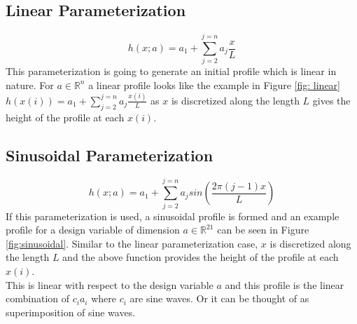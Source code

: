 \documentclass{article}
\begin{document}
\subsection{Linear Parameterization}
\begin{equation}
h(x;a) = a_1 + \sum_{j=2}^{j=n} a_j \frac{x}{L} 
\end{equation}
This parameterization is going to generate an initial profile which is linear in nature. For $a \in \mathbb{R}^n$ a linear profile looks like the example in Figure \ref{fig: linear} \\
$h(x(i)) = a_1 + \sum_{j=2}^{j=n} a_j \frac{x(i)}{L}$ as $ x $ is discretized along the length $L$ gives the height of the profile at each $x(i)$. \\
\newline
\subsection{Sinusoidal Parameterization}
\begin{equation}
h(x;a) = a_1 + \sum_{j=2}^{j=n} a_j sin\left(\frac{2\pi(j-1)x}{L}\right) 
\end{equation} 
If this parameterization is used, a sinusoidal profile is formed and an example profile for a design variable of dimension $a \in \mathbb{R}^{21}$ can be seen in Figure \ref{fig:sinusoidal}. Similar to the linear parameterization case, $x$ is discretized along the length $L$ and the above function provides the height of the profile at each $x(i)$. \\
This is linear with respect to the design variable $a$ and this profile is the linear combination of $c_ia_i$ where $c_i$ are sine waves. Or it can be thought of as superimposition of sine waves.
\end{document}
